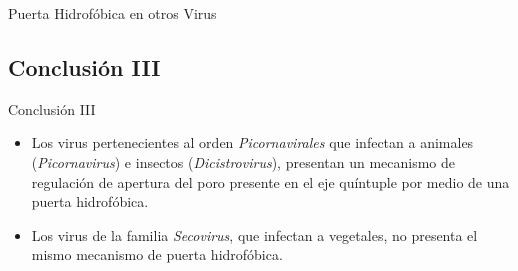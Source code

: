 \documentclass[8pt]{beamer}
\begin{document}
\begin{frame}{Puerta Hidrofóbica en otros Virus}
\begin{minipage}[t]{0.6\textwidth}
{}
\end{minipage}
\end{frame}

\subsection{Conclusión III}
\begin{frame}{Conclusión III}
\begin{itemize}
    \item Los virus pertenecientes al orden \textit{Picornavirales} que infectan a animales (\textit{Picornavirus}) e insectos (\textit{Dicistrovirus}), presentan un mecanismo de regulación de apertura del poro presente en el eje quíntuple por medio de una puerta hidrofóbica.\vfill
    \item Los virus de la familia \textit{Secovirus}, que infectan a vegetales, no presenta el mismo mecanismo de puerta hidrofóbica.
\end{itemize}
\end{frame}
\end{document}
